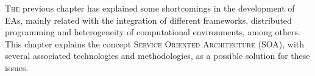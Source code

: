 \label{chap:soa} %


\minitoc\mtcskip
\vfill
\lettrine{T}{he} previous chapter has explained some shortcomings %
 in the development of EAs, mainly related with the integration of
 different frameworks, distributed programming and heterogeneity of
 computational environments, among others. This chapter explains the
 concept \textsc{Service Oriented Architecture} (SOA), with several
 associated technologies and methodologies, as a possible solution for
 these issues. %

